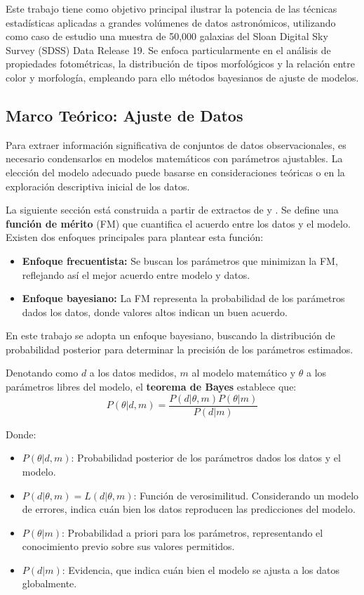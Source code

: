 \documentclass[twocolumn]{article}
\begin{document}
Este trabajo tiene como objetivo principal ilustrar la potencia de las técnicas estadísticas aplicadas a grandes volúmenes de datos astronómicos, utilizando como caso de estudio una muestra de 50,000 galaxias del Sloan Digital Sky Survey (SDSS) Data Release 19. Se enfoca particularmente en el análisis de propiedades fotométricas, la distribución de tipos morfológicos y la relación entre color y morfología, empleando para ello métodos bayesianos de ajuste de modelos.

\subsection{Marco Teórico: Ajuste de Datos}

Para extraer información significativa de conjuntos de datos observacionales, es necesario condensarlos en modelos matemáticos con parámetros ajustables. La elección del modelo adecuado puede basarse en consideraciones teóricas o en la exploración descriptiva inicial de los datos.

\medskip
La siguiente sección está construida a partir de extractos de \citet{libroimportante} y \citet{zandivarez}.
Se define una \textbf{función de mérito} (FM) que cuantifica el acuerdo entre los datos y el modelo. Existen dos enfoques principales para plantear esta función:

\begin{itemize}
\item \textbf{Enfoque frecuentista:} Se buscan los parámetros que minimizan la FM, reflejando así el mejor acuerdo entre modelo y datos.
\item \textbf{Enfoque bayesiano:} La FM representa la probabilidad de los parámetros dados los datos, donde valores altos indican un buen acuerdo.
\end{itemize} 

En este trabajo se adopta un enfoque bayesiano, buscando la distribución de probabilidad posterior para determinar la precisión de los parámetros estimados.

\medskip

Denotando como $d$ a los datos medidos, $m$ al modelo matemático y $\theta$ a los parámetros libres del modelo, el \textbf{teorema de Bayes} establece que:
\begin{equation}
P(\theta|d,m) = \frac{P(d|\theta,m)P(\theta|m)}{P(d|m)}
\end{equation}

Donde: 
\begin{itemize}
\item $P(\theta|d,m)$: Probabilidad posterior de los parámetros dados los datos y el modelo.
\item $P(d|\theta,m) = L(d|\theta,m)$: Función de verosimilitud. Considerando un modelo de errores, indica cuán bien los datos reproducen las predicciones del modelo.
\item $P(\theta|m)$: Probabilidad a priori para los parámetros, representando el conocimiento previo sobre sus valores permitidos.
\item $P(d|m)$: Evidencia, que indica cuán bien el modelo se ajusta a los datos globalmente.
\end{itemize}
\end{document}
